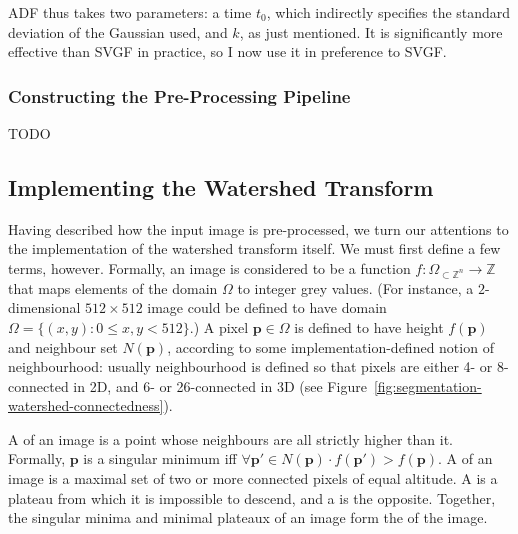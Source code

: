ADF thus takes two parameters: a time $t_0$, which indirectly specifies the standard deviation of the Gaussian used, and $k$, as just mentioned. It is significantly more effective than SVGF in practice, so I now use it in preference to SVGF.

\subsubsection{Constructing the Pre-Processing Pipeline}

TODO

\subsection{Implementing the Watershed Transform}

Having described how the input image is pre-processed, we turn our attentions to the implementation of the watershed transform itself. We must first define a few terms, however. Formally, an image is considered to be a function $f: \Omega_{\subset \mathbb{Z}^n} \to \mathbb{Z}$ that maps elements of the domain $\Omega$ to integer grey values. (For instance, a $2$-dimensional $512 \times 512$ image could be defined to have domain $\Omega = \{(x,y) : 0 \le x,y < 512\}$.) A pixel $\mathbf{p} \in \Omega$ is defined to have height $f(\mathbf{p})$ and neighbour set $N(\mathbf{p})$, according to some implementation-defined notion of neighbourhood: usually neighbourhood is defined so that pixels are either 4- or 8-connected in 2D, and 6- or 26-connected in 3D (see Figure~\ref{fig:segmentation-watershed-connectedness}).


A  of an image is a point whose neighbours are all strictly higher than it. Formally, $\mathbf{p}$ is a singular minimum iff $\forall \mathbf{p'} \in N(\mathbf{p}) \cdot f(\mathbf{p'}) > f(\mathbf{p})$. A  of an image is a maximal set of two or more connected pixels of equal altitude. A  is a plateau from which it is impossible to descend, and a  is the opposite. Together, the singular minima and minimal plateaux of an image form the  of the image.

